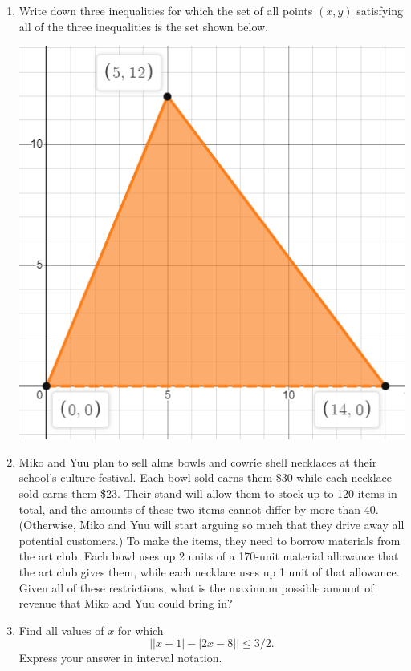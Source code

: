 \begin{enumerate}[resume]
\item Write down three inequalities for which the set of all points $(x,y)$ satisfying all of the three inequalities is the set shown below.
\begin{center}
\includegraphics[scale=0.4]{lin-ineq-triangle.png}
\end{center}
\item Miko and Yuu plan to sell alms bowls and cowrie shell necklaces at their school's culture festival. Each bowl sold earns them \$30 while each necklace sold earns them \$23. Their stand will allow them to stock up to 120 items in total, and the amounts of these two items cannot differ by more than 40. (Otherwise, Miko and Yuu will start arguing so much that they drive away all potential customers.) To make the items, they need to borrow materials from the art club. Each bowl uses up 2 units of a 170-unit material allowance that the art club gives them, while each necklace uses up 1 unit of that allowance. Given all of these restrictions, what is the maximum possible amount of revenue that Miko and Yuu could bring in?
\item Find all values of $x$ for which
\begin{equation*}
\lvert\lvert x - 1\rvert - \lvert 2x - 8\rvert\rvert\leq 3/2.
\end{equation*}
Express your answer in interval notation.
\end{enumerate}


